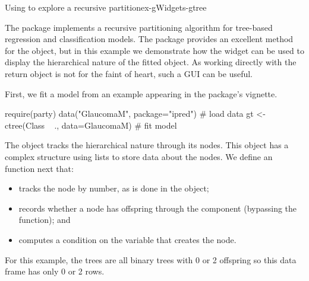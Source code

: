 \begin{example}{Using  to explore a recursive partition}{ex-gWidgets-gtree}

The  package implements a recursive partitioning algorithm
for tree-based regression and classification models. The package
provides an excellent  method for the object, but in this
example we demonstrate how the  widget can be used to
display the hierarchical nature of the fitted object. As working
directly with the return object is not for the faint of heart, such a
GUI can be useful.

First, we fit a model from an
example appearing in the package's vignette.

\begin{Schunk}
\begin{Sinput}
 require(party)
 data("GlaucomaM", package="ipred")      # load data
 gt <- ctree(Class ~ ., data=GlaucomaM)  # fit model
\end{Sinput}
\end{Schunk}

The  object tracks the hierarchical nature through its
nodes. This object has a complex structure using lists to store data
about the nodes. We define an  function next that:
\begin{itemize}
\item tracks the node by number, as is done in the  object;
\item records whether a node has offspring through the 
  component (bypassing the  function); and
\item computes a
  condition on the variable that creates the node.
\end{itemize}
For this example, the
trees are all binary trees with 0 or 2 offspring so this data frame
has only 0 or 2 rows.

\begin{Schunk}
\end{Schunk}
\end{example}

